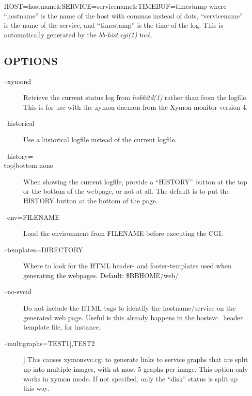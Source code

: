 HOST=hostname\&SERVICE=servicename\&TIMEBUF=timestamp  
 where ``hostname'' is the name of the host with commas instead of dots, ``servicename'' is the name of the service, and ``timestamp'' is the time of the log. This is automatically generated by the \emph{bb-hist.cgi(1)}
 tool. 



\subsection{OPTIONS}
\begin{description}
\item[--xymond] Retrieve the current status log from \emph{hobbitd(1)}
 rather than from the logfile. This is for use with the xymon daemon from the Xymon monitor version 4. 

 

\item[--historical] Use a historical logfile instead of the current logfile. 

 

\item[--history=\\{top|bottom|none\\}] When showing the current logfile, provide a ``HISTORY'' button at the top or the bottom of the webpage, or not at all. The default is to put the HISTORY button at the bottom of the page. 

 

\item[--env=FILENAME] Load the environment from FILENAME before executing the CGI. 

 

\item[--templates=DIRECTORY] Where to look for the HTML header- and footer-templates used when generating the webpages. Default: \$BBHOME/web/ 

 

\item[--no-svcid] Do not include the HTML tags to identify the hostname/service on the generated web page. Useful is this already happens in the hostsvc\_header template file, for instance. 

 

\item[--multigraphs=TEST1[,TEST2]] This causes xymonsvc.cgi to generate links to service graphs that are split up into multiple images, with at most 5 graphs per image. This option only works in xymon mode. If not specified, only the ``disk'' status is split up this way. 


\end{description}
